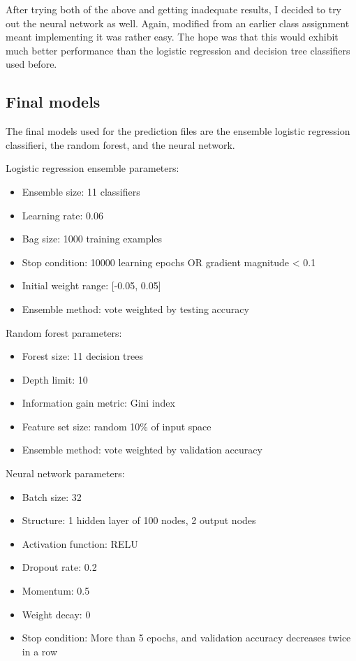 \documentclass[10pt,a4paper]{article}
\begin{document}
After trying both of the above and getting inadequate results, I decided to try out the neural network as well. Again, modified from an earlier class assignment meant implementing it was rather easy. The hope was that this would exhibit much better performance than the logistic regression and decision tree classifiers used before.

\subsection{Final models}
The final models used for the prediction files are the ensemble logistic regression classifieri, the random forest, and the neural network.

Logistic regression ensemble parameters:
\begin{itemize}
	\item Ensemble size: 11 classifiers
	\item Learning rate: 0.06
	\item Bag size: 1000 training examples
	\item Stop condition: 10000 learning epochs OR gradient magnitude < 0.1
	\item Initial weight range: [-0.05, 0.05]
	\item Ensemble method: vote weighted by testing accuracy
\end{itemize}

Random forest parameters:
\begin{itemize}
	\item Forest size: 11 decision trees
	\item Depth limit: 10
	\item Information gain metric: Gini index
	\item Feature set size: random 10\% of input space
	\item Ensemble method: vote weighted by validation accuracy
\end{itemize}

Neural network parameters:
\begin{itemize}
	\item Batch size: 32
	\item Structure: 1 hidden layer of 100 nodes, 2 output nodes
	\item Activation function: RELU
	\item Dropout rate: 0.2
	\item Momentum: 0.5
	\item Weight decay: 0
	\item Stop condition: More than 5 epochs, and validation accuracy decreases twice in a row
\end{itemize}
	
\end{document}
